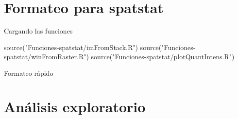\documentclass[
  11pt,
  ignorenonframetext,
]{beamer}
\newenvironment{Shaded}{}{}
\newcommand{\AttributeTok}[1]{\textcolor[rgb]{0.49,0.56,0.16}{#1}}
\newcommand{\FloatTok}[1]{\textcolor[rgb]{0.25,0.63,0.44}{#1}}
\newcommand{\FunctionTok}[1]{\textcolor[rgb]{0.02,0.16,0.49}{#1}}
\newcommand{\NormalTok}[1]{#1}
\newcommand{\OtherTok}[1]{\textcolor[rgb]{0.00,0.44,0.13}{#1}}
\newcommand{\SpecialCharTok}[1]{\textcolor[rgb]{0.25,0.44,0.63}{#1}}
\newcommand{\StringTok}[1]{\textcolor[rgb]{0.25,0.44,0.63}{#1}}
\begin{document}
\hypertarget{formateo-para-spatstat}{%
\section{Formateo para spatstat}\label{formateo-para-spatstat}}

\begin{frame}[fragile]{Cargando las funciones}
\protect\hypertarget{cargando-las-funciones}{}
\begin{Shaded}
\begin{Highlighting}[]
\FunctionTok{source}\NormalTok{(}\StringTok{"Funciones{-}spatstat/imFromStack.R"}\NormalTok{)}
\FunctionTok{source}\NormalTok{(}\StringTok{"Funciones{-}spatstat/winFromRaster.R"}\NormalTok{)}
\FunctionTok{source}\NormalTok{(}\StringTok{"Funciones{-}spatstat/plotQuantIntens.R"}\NormalTok{)}
\end{Highlighting}
\end{Shaded}
\end{frame}

\begin{frame}[fragile]{Formateo rápido}
\protect\hypertarget{formateo-ruxe1pido}{}
\begin{Shaded}
\end{Shaded}
\end{frame}

\hypertarget{anuxe1lisis-exploratorio}{%
\section{Análisis exploratorio}\label{anuxe1lisis-exploratorio}}
\end{document}
